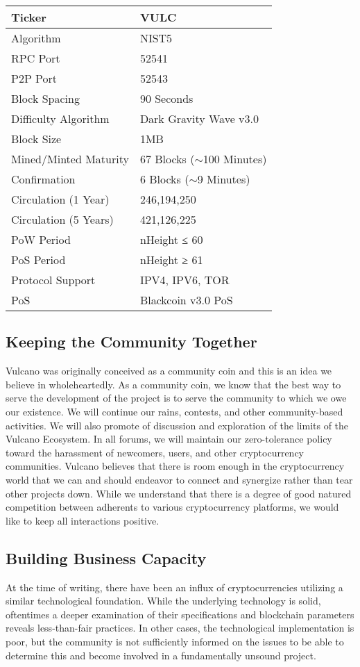 \documentclass[A4paper, 12pt]{article}
\begin{document}
\begin{table}[h]
\centering
\begin{tabular}{@{}ll@{}}
\toprule
Ticker & VULC \\ \midrule
Algorithm & NIST5 \\
RPC Port & 52541 \\
P2P Port & 52543 \\
Block Spacing & 90 Seconds \\
Difficulty Algorithm & Dark Gravity Wave v3.0 \\
Block Size & 1MB \\
Mined/Minted Maturity & 67 Blocks ($\sim$100 Minutes) \\
Confirmation & 6 Blocks ($\sim$9 Minutes) \\
Circulation (1 Year) & 246,194,250 \\
Circulation (5 Years) & 421,126,225 \\
PoW Period & nHeight ≤ 60 \\
PoS Period & nHeight ≥ 61 \\
Protocol Support & IPV4, IPV6, TOR \\
PoS & Blackcoin v3.0 PoS \\ \bottomrule
\end{tabular}
\end{table}

\subsection{Keeping the Community Together}
Vulcano was originally conceived as a community coin and this is an idea we believe in wholeheartedly. As a community coin, we know that the best way to serve the development of the project is to serve the community to which we owe our existence. We will continue our rains, contests, and other community-based activities. We will also promote of discussion and exploration of the limits of the Vulcano Ecosystem. In all forums, we will maintain our zero-tolerance policy toward the harassment of newcomers, users, and other cryptocurrency communities. Vulcano believes that there is room enough in the cryptocurrency world that we can and should endeavor to connect and synergize rather than tear other projects down. While we understand that there is a degree of good natured competition between adherents to various cryptocurrency platforms, we would like to keep all interactions positive.

\subsection{Building Business Capacity}
At the time of writing, there have been an influx of cryptocurrencies utilizing a similar technological foundation. While the underlying technology is solid, oftentimes a deeper examination of their specifications and blockchain parameters reveals less-than-fair practices. In other cases, the technological implementation is poor, but the community is not sufficiently informed on the issues to be able to determine this and become involved in a fundamentally unsound project. 
\end{document}

